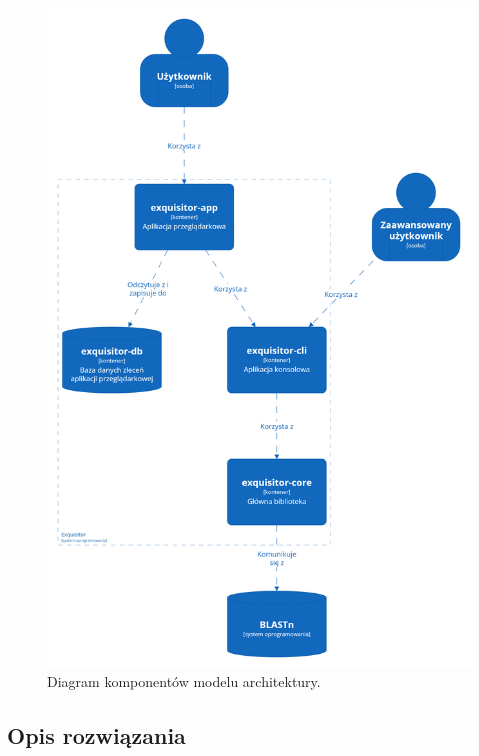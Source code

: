         \begin{figure}[!htb]
            \begin{center}
                \includegraphics[width=\textwidth]{tex/pictures/app/c4_container.png}
            \end{center}
            \caption{
                Diagram komponentów modelu architektury.
            }\label{Picture:App:C4:Container}
        \end{figure}

    \subsection{Opis rozwiązania}


